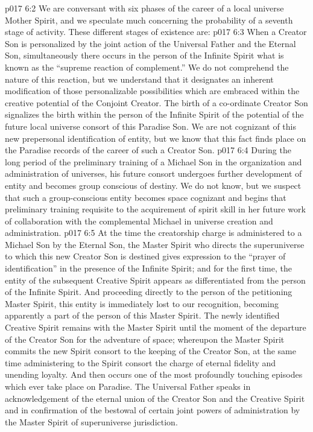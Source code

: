 \vs p017 6:2 \pc We are conversant with six phases of the career of a local universe Mother Spirit, and we speculate much concerning the probability of a seventh stage of activity. These different stages of existence are:
\vs p017 6:3 \bibnobreakspace {} When a Creator Son is personalized by the joint action of the Universal Father and the Eternal Son, simultaneously there occurs in the person of the Infinite Spirit what is known as the “supreme reaction of complement.” We do not comprehend the nature of this reaction, but we understand that it designates an inherent modification of those personalizable possibilities which are embraced within the creative potential of the Conjoint Creator. The birth of a co\hyp{}ordinate Creator Son signalizes the birth within the person of the Infinite Spirit of the potential of the future local universe consort of this Paradise Son. We are not cognizant of this new prepersonal identification of entity, but we know that this fact finds place on the Paradise records of the career of such a Creator Son.
\vs p017 6:4 \bibnobreakspace {} During the long period of the preliminary training of a Michael Son in the organization and administration of universes, his future consort undergoes further development of entity and becomes group conscious of destiny. We do not know, but we suspect that such a group\hyp{}conscious entity becomes space cognizant and begins that preliminary training requisite to the acquirement of spirit skill in her future work of collaboration with the complemental Michael in universe creation and administration.
\vs p017 6:5 \bibnobreakspace {} At the time the creatorship charge is administered to a Michael Son by the Eternal Son, the Master Spirit who directs the superuniverse to which this new Creator Son is destined gives expression to the “prayer of identification” in the presence of the Infinite Spirit; and for the first time, the entity of the subsequent Creative Spirit appears as differentiated from the person of the Infinite Spirit. And proceeding directly to the person of the petitioning Master Spirit, this entity is immediately lost to our recognition, becoming apparently a part of the person of this Master Spirit. The newly identified Creative Spirit remains with the Master Spirit until the moment of the departure of the Creator Son for the adventure of space; whereupon the Master Spirit commits the new Spirit consort to the keeping of the Creator Son, at the same time administering to the Spirit consort the charge of eternal fidelity and unending loyalty. And then occurs one of the most profoundly touching episodes which ever take place on Paradise. The Universal Father speaks in acknowledgement of the eternal union of the Creator Son and the Creative Spirit and in confirmation of the bestowal of certain joint powers of administration by the Master Spirit of superuniverse jurisdiction.
